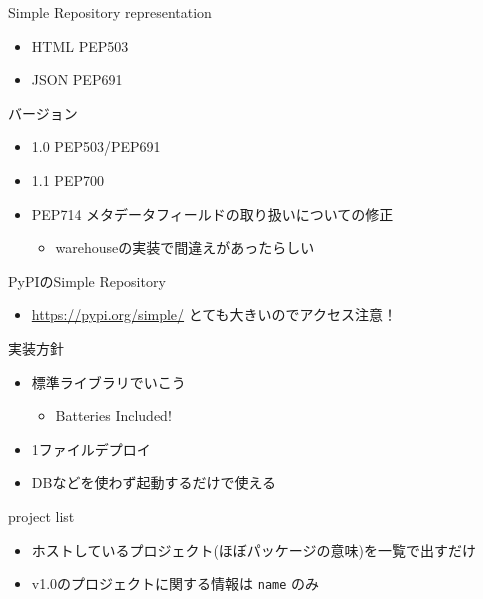\documentclass[presentation]{beamer}
\begin{document}
\begin{frame}[label={sec:orgd0306bf}]{Simple Repository}
representation

\begin{itemize}
\item HTML PEP503
\item JSON PEP691
\end{itemize}

バージョン
\begin{itemize}
\item 1.0 PEP503/PEP691
\item 1.1 PEP700
\item PEP714 メタデータフィールドの取り扱いについての修正
\begin{itemize}
\item warehouseの実装で間違えがあったらしい
\end{itemize}
\end{itemize}
\end{frame}

\begin{frame}[label={sec:orgcf625d9}]{PyPIのSimple Repository}
\begin{itemize}
\item \url{https://pypi.org/simple/} とても大きいのでアクセス注意！
\end{itemize}
\end{frame}


\begin{frame}[label={sec:orgfbc8b18}]{実装方針}
\begin{itemize}
\item 標準ライブラリでいこう
\begin{itemize}
\item Batteries Included!
\end{itemize}
\item 1ファイルデプロイ
\item DBなどを使わず起動するだけで使える
\end{itemize}
\end{frame}

\begin{frame}[label={sec:org58ec72a},fragile]{project list}
 \begin{itemize}
\item ホストしているプロジェクト(ほぼパッケージの意味)を一覧で出すだけ
\item v1.0のプロジェクトに関する情報は \texttt{name} のみ
\end{itemize}
\end{frame}
\end{document}
